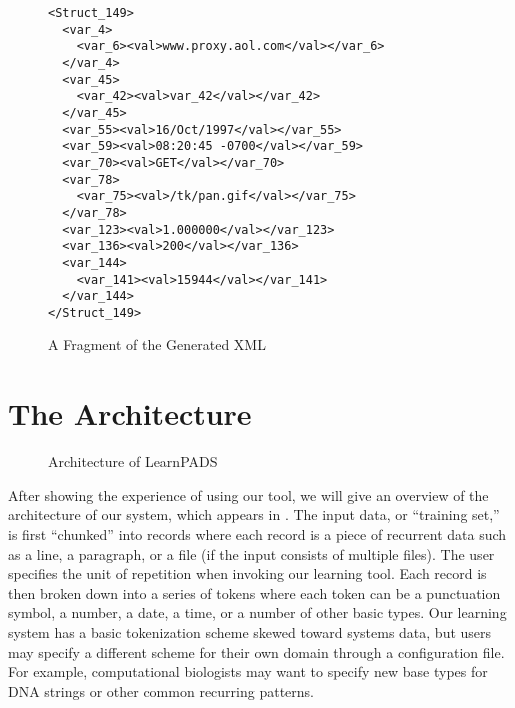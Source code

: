 \documentclass[preprint]{sig-alternate-sigmod08}
\begin{document}


\begin{figure}
\begin{center}
{\small
\begin{verbatim}
<Struct_149>
  <var_4>
    <var_6><val>www.proxy.aol.com</val></var_6>
  </var_4>
  <var_45>
    <var_42><val>var_42</val></var_42>
  </var_45>
  <var_55><val>16/Oct/1997</val></var_55>
  <var_59><val>08:20:45 -0700</val></var_59>
  <var_70><val>GET</val></var_70>
  <var_78>
    <var_75><val>/tk/pan.gif</val></var_75>
  </var_78>
  <var_123><val>1.000000</val></var_123>
  <var_136><val>200</val></var_136>
  <var_144>
    <var_141><val>15944</val></var_141>
  </var_144>
</Struct_149>
\end{verbatim}
}
\caption{A Fragment of the Generated XML}\label{fig-xml}
\end{center}
\end{figure}

\section{The Architecture}
\begin{figure}
\begin{center}
\caption{Architecture of LearnPADS}
\vspace*{-5mm}
\label{fig-archi}
\end{center}
\end{figure}
After showing the experience of using our tool, we will give an
overview of the architecture of our system, which appears in .
The input data, or ``training set,'' 
is first ``chunked'' into records where
each record is a piece of recurrent data such as a line, 
a paragraph, or a file (if the input consists of multiple files).
The user specifies the unit of repetition when invoking our 
learning tool.
Each record is then broken down into a series of tokens where each
token can be a punctuation symbol, a number, a date, a time, or a number of other
basic types.  Our learning system has a basic tokenization scheme
skewed toward systems data, but users may specify a different scheme 
for their own domain through a configuration file.  For example,
computational biologists may want to specify new base types for DNA strings
or other common recurring patterns.
\end{document}

